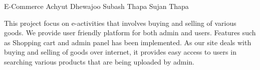  \begin{conf-abstract}[]
 {E-Commerce}
 {
  	Achyut Dhewajoo
  	 	Subash Thapa
  	Sujan Thapa
 }
{}

This project focus on e-activities that involves buying and selling of various goods. We provide user friendly platform for both admin and users. Features such as Shopping cart and admin panel has been implemented. As our site deals with buying and selling of goods over internet, it provides easy access to users in searching various products that are being uploaded by admin.

 \end{conf-abstract}